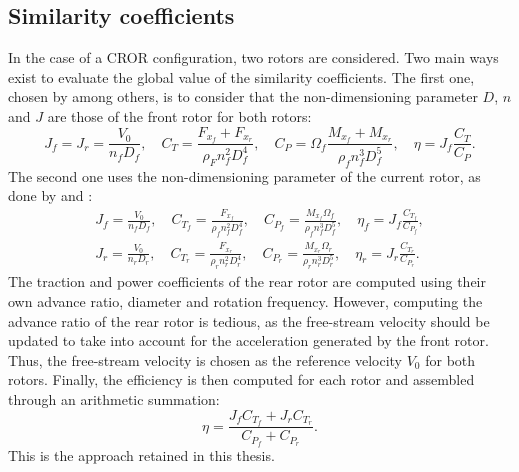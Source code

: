 \subsection{Similarity coefficients}
\label{sub:cror_similarity_coeff}

In the case of a CROR configuration, two rotors are considered.
Two main ways exist to evaluate the global value of the
similarity coefficients. The first one, chosen by
\citet{Bechet2011} among others, is to consider
that the non-dimensioning parameter $D$, $n$ and $J$ are those
of the front rotor for both rotors:
\begin{equation}
    J_f = J_r = \frac{V_0}{n_f D_f}, \quad
    C_T = \frac{F_{x_f} + F_{x_r}}{\rho_F n_f ^ 2  D_f ^ 4}, \quad
    C_P = \Omega_f \frac{M_{x_f} + M_{x_r}}{\rho_f n_f ^ 3 D_f ^ 5}, \quad
    \eta = J_f \frac{C_T}{C_P}.
\end{equation} 
The second one uses the non-dimensioning parameter of the current rotor,
as done by \citet{Stuermer2008} and \citet{Zachariadis2011}:
\begin{equation}
    \begin{split}
        J_f = \frac{V_0}{n_f D_f}, \quad
        C_{T_f} = \frac{F_{x_f}}{\rho_f n_f ^ 2  D_f ^ 4}, \quad
        C_{P_f} = \frac{M_{x_f}\Omega_f}{\rho_f n_f ^ 3 D_f ^ 5}, \quad
        \eta_f = J_f \frac{C_{T_f}}{C_{P_f}}, \\
        J_r = \frac{V_0}{n_r D_r}, \quad
        C_{T_r} = \frac{F_{x_r}}{\rho_r n_r ^ 2  D_r ^ 4}, \quad
        C_{P_r} = \frac{M_{x_r}\Omega_r}{\rho_r n_r ^ 3 D_r ^ 5}, \quad
        \eta_r = J_r \frac{C_{T_r}}{C_{P_r}}.
    \end{split}
\end{equation} 
The traction and power coefficients of the rear rotor are
computed using their own advance ratio, diameter and rotation frequency.
However, computing the advance ratio of the rear rotor is tedious, as
the free-stream velocity should be updated to take into account
for the acceleration generated by the front rotor. Thus, the free-stream
velocity is chosen as the reference velocity $V_0$ for both rotors.
Finally, the efficiency is then computed for each rotor and
assembled through an arithmetic summation:
\begin{equation}
    \eta = \frac{J_f C_{T_f} + J_r C_{T_r}}{C_{P_f} + C_{P_r}}.
\end{equation}
This is the approach retained in this thesis.
